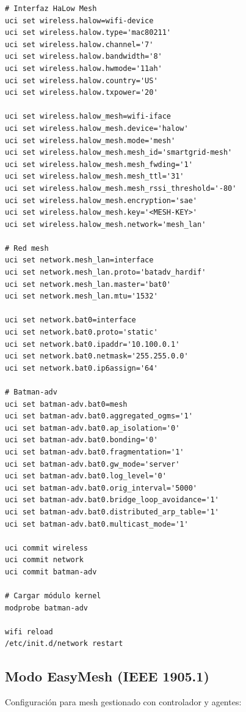 \begin{verbatim}
# Interfaz HaLow Mesh
uci set wireless.halow=wifi-device
uci set wireless.halow.type='mac80211'
uci set wireless.halow.channel='7'
uci set wireless.halow.bandwidth='8'
uci set wireless.halow.hwmode='11ah'
uci set wireless.halow.country='US'
uci set wireless.halow.txpower='20'

uci set wireless.halow_mesh=wifi-iface
uci set wireless.halow_mesh.device='halow'
uci set wireless.halow_mesh.mode='mesh'
uci set wireless.halow_mesh.mesh_id='smartgrid-mesh'
uci set wireless.halow_mesh.mesh_fwding='1'
uci set wireless.halow_mesh.mesh_ttl='31'
uci set wireless.halow_mesh.mesh_rssi_threshold='-80'
uci set wireless.halow_mesh.encryption='sae'
uci set wireless.halow_mesh.key='<MESH-KEY>'
uci set wireless.halow_mesh.network='mesh_lan'

# Red mesh
uci set network.mesh_lan=interface
uci set network.mesh_lan.proto='batadv_hardif'
uci set network.mesh_lan.master='bat0'
uci set network.mesh_lan.mtu='1532'

uci set network.bat0=interface
uci set network.bat0.proto='static'
uci set network.bat0.ipaddr='10.100.0.1'
uci set network.bat0.netmask='255.255.0.0'
uci set network.bat0.ip6assign='64'

# Batman-adv
uci set batman-adv.bat0=mesh
uci set batman-adv.bat0.aggregated_ogms='1'
uci set batman-adv.bat0.ap_isolation='0'
uci set batman-adv.bat0.bonding='0'
uci set batman-adv.bat0.fragmentation='1'
uci set batman-adv.bat0.gw_mode='server'
uci set batman-adv.bat0.log_level='0'
uci set batman-adv.bat0.orig_interval='5000'
uci set batman-adv.bat0.bridge_loop_avoidance='1'
uci set batman-adv.bat0.distributed_arp_table='1'
uci set batman-adv.bat0.multicast_mode='1'

uci commit wireless
uci commit network
uci commit batman-adv

# Cargar módulo kernel
modprobe batman-adv

wifi reload
/etc/init.d/network restart
\end{verbatim}

\subsection{Modo EasyMesh (IEEE 1905.1)}

Configuración para mesh gestionado con controlador y agentes:


